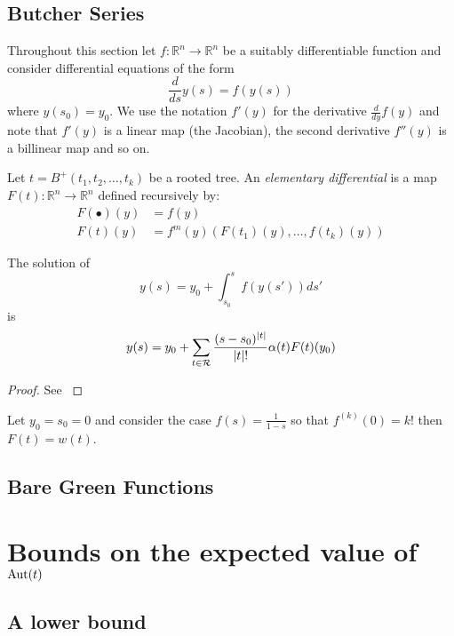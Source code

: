  \subsection{Butcher Series}
 Throughout this section let $f: \mathbb{R}^n \rightarrow \mathbb{R}^n$ be a suitably differentiable function and consider differential equations of the form 
 \[
  \frac{d}{ds}{y(s)} = f(y(s))
 \]
where $y(s_0) = y_0$.  We use the notation $f'(y)$ for the derivative $\frac{d}{dy}f(y)$ and note that $f'(y)$ is a linear map (the Jacobian), the second derivative $f''(y)$ is a billinear map and so on. 

\begin{defn}
Let $t = B^{+}(t_1,t_2,\dots,t_k)$ be  a rooted tree. An \emph{elementary differential} is a map  $F(t):  \mathbb{R}^n \rightarrow \mathbb{R}^n$ defined 
recursively by:
\begin{align}
 F(\bullet)(y) &= f(y) \\%
 F(t)(y) &= f^{m}(y)(F(t_1)(y),\dots,f(t_k)(y))
 \end{align}
\end{defn}
\begin{theorem}\label{Butcher}
 The solution of 
 \[
  y(s) = y_0 + \int_{s_0}^{s} f(y(s')) ds'
 \]
is
\[
 y(s) = y_0 + \sum_{t \in \operatorname{\mathcal{R}}} \frac{(s-s_0)^{\lvert t \rvert}}{\lvert t \rvert !}\alpha(t)F(t)(y_0)
\]
\end{theorem}

\begin{proof}
 See \cite{Butcher,Brouder}
\end{proof}

\begin{ex}\label{ex:1}
 Let $y_0 = s_0 = 0$  and consider the case $f(s) = \frac{1}{1-s}$ so that  $f^{(k)}(0) = k!$ then $F(t) = w(t)$.
\end{ex}

\subsection{Bare Green Functions}

\section{Bounds on the expected value of $\operatorname{Aut}(t)$}
\subsection{A lower bound}
